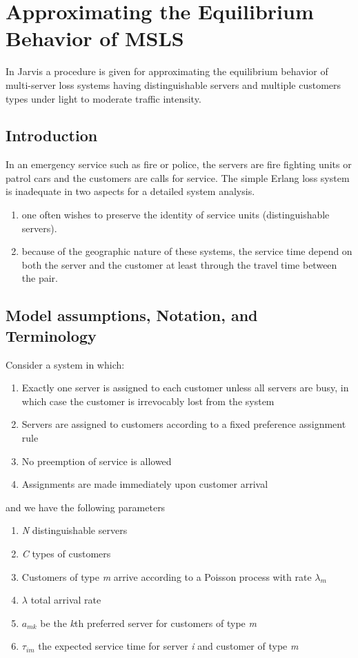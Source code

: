 
\chapter{Approximating the Equilibrium Behavior of MSLS}
In Jarvis \cite{jarvis1985approximating}
a procedure is given
for approximating the equilibrium behavior
of multi-server loss systems having distinguishable servers
and multiple customers types
under light to moderate traffic intensity.

\section{Introduction}
In an emergency service such as fire or police, 
the servers are fire fighting units or patrol cars
and the customers are calls for service.
The simple Erlang loss system
is inadequate in two aspects for a detailed system analysis.
\begin{enumerate}
\item one often wishes
  to preserve the identity of service units (distinguishable servers).
\item because
  of the geographic nature of these systems,
  the service time depend on both
  the server and the customer
  at least through the travel time between the pair.
\end{enumerate}

\section{Model assumptions, Notation, and Terminology}
Consider a system in which:
\begin{enumerate}
\item Exactly one server
  is assigned to each customer
  unless all servers are busy, 
  in which case
  the customer is irrevocably lost from the system
\item Servers are assigned
  to customers according to a fixed preference assignment rule
\item No preemption of service is allowed
\item Assignments are made immediately
  upon customer arrival
\end{enumerate}

and we have the following parameters
\begin{enumerate}
\item \textit{N} distinguishable servers
\item \textit{C} types of customers
\item Customers of type \textit{m}
  arrive according to a Poisson process with rate $\lambda_{m}$
\item $\lambda$ total arrival rate
\item $a_{mk}$ be the \textit{k}th preferred server
  for customers of type \textit{m}
\item $\tau_{im}$ the expected service time
  for server \textit{i} and customer of type \textit{m}
\end{enumerate}

